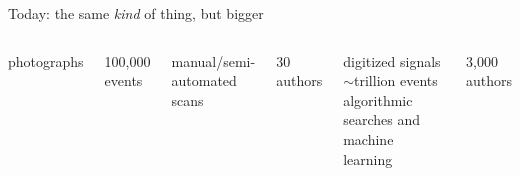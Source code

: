 \documentclass[aspectratio=169]{beamer}
\begin{document}
\begin{frame}{Today: the same {\it kind} of thing, but bigger}
\begin{columns}
\begin{center}
\begin{columns}
\centering
\vspace{-1 cm}

photographs

\vspace{\baselineskip}
\vspace{0.5 cm}
100,000 events

\vspace{0.5 cm}
manual/semi-automated scans

\vspace{\baselineskip}
\vspace{0.5 cm}
30 authors

\centering
\vspace{-1 cm}

digitized signals \\

\vspace{0.5 cm}
$\sim$trillion events \\

\vspace{0.5 cm}
algorithmic searches and machine learning

\vspace{0.5 cm}
3,000 authors
\end{columns}
\end{center}


\end{columns}
\end{frame}
\end{document}
